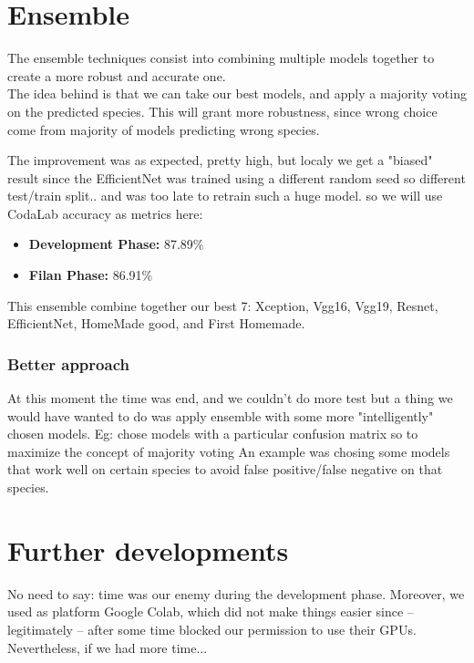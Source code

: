 \documentclass[10pt]{article}
\begin{document}
\section{Ensemble}
The ensemble techniques consist into combining multiple models together to create a more robust and accurate one.\\
The idea behind is that we can take our best models, and apply a majority voting on the predicted species.
This will grant more robustness, since wrong choice come from majority of models predicting wrong species.

The improvement was as expected, pretty high, but localy we get a "biased" result since the EfficientNet was trained using a different random seed so different test/train split.. and was too late to retrain such a huge model.
so we will use CodaLab accuracy as metrics here:
\begin{itemize}
  \item \textbf{Development Phase:} 87.89\%
  \item \textbf{Filan Phase:} 86.91\%
\end{itemize}

This ensemble combine together our best 7: Xception, Vgg16, Vgg19, Resnet, EfficientNet, HomeMade good, and First Homemade.

\subsubsection{Better approach}
At this moment the time was end, and we couldn't do more test but a thing we would have wanted to do was apply ensemble with some more "intelligently" chosen models.
Eg: chose models with a particular confusion matrix so to maximize the concept of majority voting
An example was chosing some models that work well on certain species to avoid false positive/false negative on that species.



\section{Further developments}
No need to say: time was our enemy during the development phase. Moreover, we used as platform Google Colab, which did not make things easier since -- legitimately -- after some time blocked our permission to use their GPUs.\\[0.1cm]
Nevertheless, if we had more time...
\end{document}
